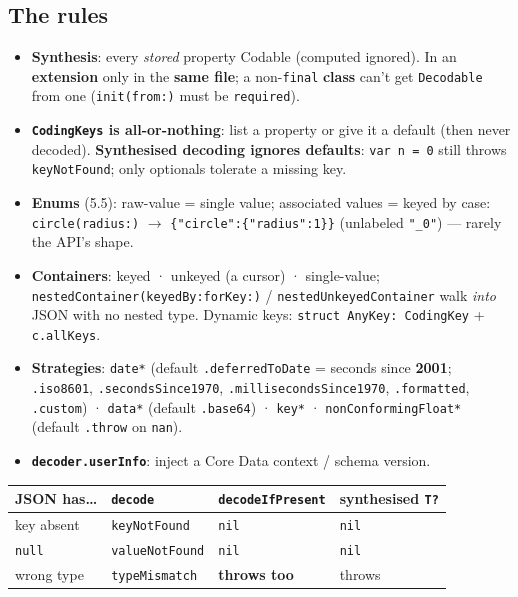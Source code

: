 \documentclass[8pt]{extarticle}
\begin{document}
\begin{multicols}{2}
\raggedright

\section{The rules}
\begin{itemize}
  \item \textbf{Synthesis}: every \emph{stored} property Codable (computed ignored). In an
        \textbf{extension} only in the \textbf{same file}; a non-\texttt{final} \textbf{class}
        can't get \texttt{Decodable} from one (\texttt{init(from:)} must be \texttt{required}).
  \item \textbf{\texttt{CodingKeys} is all-or-nothing}: list a property or give it a default
        (then never decoded). \textbf{Synthesised decoding ignores defaults}: \texttt{var n = 0}
        still throws \texttt{keyNotFound}; only optionals tolerate a missing key.
  \item \textbf{Enums} (5.5): raw-value = single value; associated values = keyed by case:
        \texttt{circle(radius:)} $\to$ \texttt{\{"circle":\{"radius":1\}\}} (unlabeled
        \texttt{"\_0"}) — rarely the API's shape.
  \item \textbf{Containers}: keyed · unkeyed (a cursor) · single-value;
        \texttt{nestedContainer(keyedBy:\allowbreak forKey:)} / \texttt{nestedUnkeyed\-Container}
        walk \emph{into} JSON with no nested type. Dynamic keys: \texttt{struct AnyKey:
        CodingKey} + \texttt{c.allKeys}.
  \item \textbf{Strategies}: \texttt{date*} (default \texttt{.deferredToDate} = seconds since
        \textbf{2001}; \texttt{.iso8601}, \texttt{.secondsSince1970}, \texttt{.milliseconds\-Since1970},
        \texttt{.formatted}, \texttt{.custom}) · \texttt{data*} (default \texttt{.base64}) ·
        \texttt{key*} · \texttt{nonConformingFloat*} (default \texttt{.throw} on \texttt{nan}).
  \item \textbf{\texttt{decoder.userInfo}}: inject a Core Data context / schema version.
\end{itemize}

{\footnotesize
\begin{tabular}{@{}L{17mm}L{15mm}L{15mm}L{19mm}@{}}
\toprule
JSON has\ldots & \texttt{decode} & \texttt{decodeIfPresent} & synthesised \texttt{T?} \\
\midrule
key absent & \texttt{keyNotFound} & \texttt{nil} & \texttt{nil} \\
\texttt{null} & \texttt{valueNotFound} & \texttt{nil} & \texttt{nil} \\
wrong type & \texttt{typeMismatch} & \textbf{throws too} & throws \\
\bottomrule
\end{tabular}}


\end{multicols}
\end{document}
